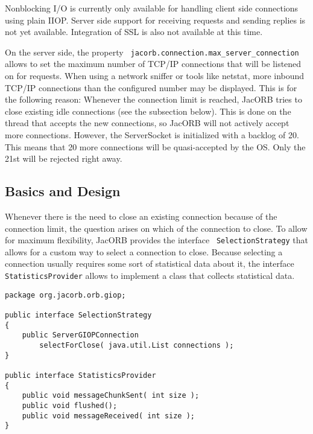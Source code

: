 Non\-blocking I/O is currently only available for handling client side
connections using plain IIOP. Server side support for receiving requests
and sending replies is not yet available. Integration of SSL is also not
available at this time.

On the server side, the property {\tt
  jacorb.connection.max\_server\_connection} allows to set the maximum number
of TCP/IP connections that will be listened on for requests. When using a
network sniffer or tools like netstat, more inbound TCP/IP connections than
the configured number may be displayed. This is for the following reason:
Whenever the connection limit is reached, JacORB tries to close existing idle
connections (see the subsection below). This is done on the thread
that accepts the new connections, so JacORB will not actively accept more
connections. However, the ServerSocket is initialized with a backlog of 20.
This means that 20 more connections will be quasi-accepted by the OS. Only the
21st will be rejected right away.

\subsection{Basics and Design}
\label{connection_management_basics}
Whenever there is the need to close an existing connection because of the
connection limit, the question arises on which of the connection to close. To
allow for maximum flexibility, JacORB provides the interface {\tt
  SelectionStrategy} that allows for a custom way to select a connection to
close. Because selecting a connection usually requires some sort of
statistical data about it, the interface {\tt
  StatisticsProvider} allows to implement a class that collects statistical
data.

\begin{small}
\begin{verbatim}
package org.jacorb.orb.giop;

public interface SelectionStrategy
{
    public ServerGIOPConnection
        selectForClose( java.util.List connections );
}

public interface StatisticsProvider
{
    public void messageChunkSent( int size );
    public void flushed();
    public void messageReceived( int size );
}
\end{verbatim}
\end{small}

